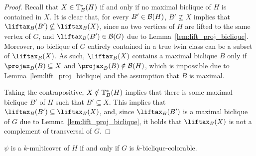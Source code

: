 \begin{proof}
    Recall that $X \in \mathbb{T}^*_{B}(H)$ if and only if no maximal biclique of $H$ is contained in $X$.
    It is clear that, for every $B' \in \mathcal{B}(H)$, $B' \nsubseteq X$ implies that $\Lift{B}(B') \nsubseteq \Lift{B}(X)$, since no two vertices of $H$ are lifted to the same vertex of $G$, and $\Lift{B}(B') \in \biq(G)$ due to Lemma~\ref{lem:lift_proj_biclique}.
    Moreover, no biclique of $G$ entirely contained in a true twin class can be a subset of $\Lift{B}(X)$. As such, $\Lift{B}(X)$ contains a maximal biclique $B$ only if $\Proj{B}(B) \subseteq X$ and $\Proj{B}(B) \notin \biq(H)$, which is impossible due to Lemma~\ref{lem:lift_proj_biclique} and the assumption that $B$ is maximal.
    
    Taking the contrapositive, $X \notin \mathbb{T}^*_{B}(H)$ implies that there is some maximal biclique $B'$ of $H$ such that $B' \subseteq X$. This implies that $\Lift{B}(B') \subseteq \Lift{B}(X)$, and, since $\Lift{B}(B')$ is a maximal biclique of $G$ due to Lemma~\ref{lem:lift_proj_biclique}, it holds that $\Lift{B}(X)$ is not a complement of transversal of $G$.
\end{proof}


\begin{theorem}
    \label{thm:lifted_multicover}
    $\psi$ is a $k$-multicover of $H$ if and only if $G$ is $k$-biclique-colorable.
\end{theorem}

